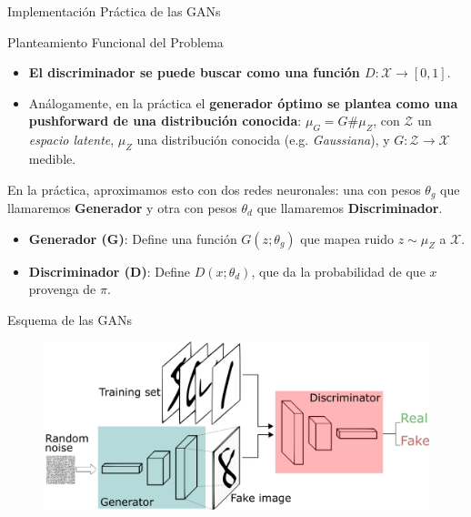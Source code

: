 \documentclass[aspectratio=169,xcolor=dvipsnames, t, spanish]{beamer}
\begin{document}
\begin{frame}{Implementación Práctica de las GANs}
\begin{block}{Planteamiento Funcional del Problema}
    \begin{itemize}
        \item \textbf{El discriminador se puede buscar como una función $D:\mathcal{X}\to[0,1]$}. 
        \item Análogamente, en la práctica el \textbf{generador óptimo se plantea como una pushforward de una distribución conocida}: $\mu_G = G \# \mu_Z$, con $\mathcal{Z}$ un \textit{espacio latente}, $\mu_Z$ una distribución conocida (e.g. \textit{Gaussiana}), y $G:\mathcal{Z} \to \mathcal{X}$ medible. %
    \end{itemize}
\end{block}
\pause
\begin{center}
    En la práctica, aproximamos esto con dos redes neuronales: una con pesos $\theta_g$ que llamaremos \textbf{Generador} y otra con pesos $\theta_d$ que llamaremos \textbf{Discriminador}.
\end{center}
    \pause
    \begin{itemize}
        \item \textbf{Generador (G)}: Define una función $G(z; \theta_g)$ que mapea ruido $z \sim \mu_Z$ a $\mathcal{X}$.
        \pause
        \item \textbf{Discriminador (D)}: Define $D(x; \theta_d)$, que da la probabilidad de que $x$ provenga de $\pi$.
    \end{itemize}
    \begin{center}
    \end{center}
\end{frame}

\begin{frame}{Esquema de las GANs}
    \begin{figure}
        \centering
        \includegraphics[width=0.9\linewidth]{figures/GANs.png}
        \label{fig:enter-label2}
    \end{figure}
\end{frame}
\end{document}
